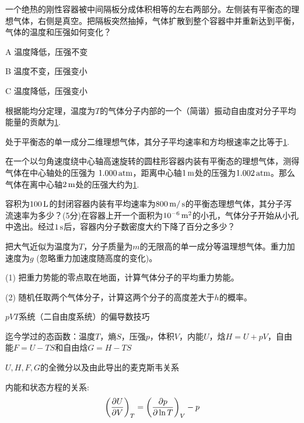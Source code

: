 \documentclass[CJK]{beamer}
\begin{document}
\begin{frame}
\bchL
一个绝热的刚性容器被中间隔板分成体积相等的左右两部分。左侧装有平衡态的理想气体，右侧是真空。把隔板突然抽掉，气体扩散到整个容器中并重新达到平衡，气体的温度和压强如何变化？
\bitem
\item[A]{温度降低，压强不变}
\item[B]{温度不变，压强变小}
\item[C]{温度降低，压强变小}
  \eitem
\echL
\end{frame}

\begin{frame}
\bchL
根据能均分定理，温度为$T$的气体分子内部的一个（简谐）振动自由度对分子平均能量的贡献为\uline{1}.
\echL
\end{frame}


\begin{frame}
\bchL
处于平衡态的单一成分二维理想气体，其分子平均速率和方均根速率之比等于\uline{1}.
\echL
\end{frame}


\begin{frame}
\bchL
在一个以匀角速度绕中心轴高速旋转的圆柱形容器内装有平衡态的理想气体，测得气体在中心轴处的压强为 $1.000\,\mathrm{atm}$，距离中心轴$1\,\mathrm{m}$处的压强为$1.002\,\mathrm{atm}$。那么气体在离中心轴$2\,\mathrm{m}$处的压强大约为\uline{1}.
\echL
\end{frame}

\begin{frame}
\bchL
容积为$100\,\mathrm{L}$的封闭容器内装有平均速率为$800\,\mathrm{m}/\,\mathrm{s}$的平衡态理想气体，其分子泻流速率为多少？(5分)在容器上开一个面积为$10^{-6}\,\mathrm{m}^2$的小孔，气体分子开始从小孔中逸出。经过$1\,\mathrm{s}$后，容器内分子数密度大约下降了百分之多少？
\echL
\end{frame}


\begin{frame}
\bchL
把大气近似为温度为$T$，分子质量为$m$的无限高的单一成分等温理想气体。重力加速度为$g$ (忽略重力加速度随高度的变化)。
\bitem
\item[(1)]{把重力势能的零点取在地面，计算气体分子的平均重力势能。}
\item[(2)]{随机任取两个气体分子，计算这两个分子的高度差大于$h$的概率。}  
\eitem
\echL
\end{frame}


\begin{frame}
\bch 
\bitem
\item{$pVT$系统（二自由度系统）的偏导数技巧}
\item{迄今学过的态函数：温度$T$，熵$S$，压强$p$，体积$V$，内能$U$，焓$H=U+pV$，自由能$F=U-TS$和自由焓$G=H-TS$}
\item{$U, H, F, G$的全微分以及由此导出的麦克斯韦关系}
\item{内能和状态方程的关系:
 $$\left(\frac{\partial U}{\partial V}\right)_{T} = \left(\frac{\partial p}{\partial \ln T}\right)_{V} - p $$}
\eitem
\ech
\end{frame}
\end{document}
